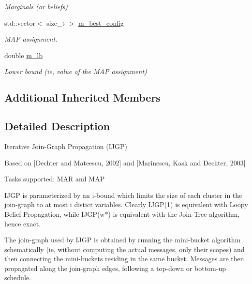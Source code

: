 \begin{DoxyCompactItemize}
\begin{DoxyCompactList}\small\item\em Marginals (or beliefs) \end{DoxyCompactList}\item 
\hypertarget{classmerlin_1_1ijgp_a6f00b802c54c7d225001577edb51bbc8}{}std\+::vector$<$ size\+\_\+t $>$ \hyperlink{classmerlin_1_1ijgp_a6f00b802c54c7d225001577edb51bbc8}{m\+\_\+best\+\_\+config}\label{classmerlin_1_1ijgp_a6f00b802c54c7d225001577edb51bbc8}

\begin{DoxyCompactList}\small\item\em M\+A\+P assignment. \end{DoxyCompactList}\item 
\hypertarget{classmerlin_1_1ijgp_a5665048f86025d11b0c4fe40eeb4ddfb}{}double \hyperlink{classmerlin_1_1ijgp_a5665048f86025d11b0c4fe40eeb4ddfb}{m\+\_\+lb}\label{classmerlin_1_1ijgp_a5665048f86025d11b0c4fe40eeb4ddfb}

\begin{DoxyCompactList}\small\item\em Lower bound (ie, value of the M\+A\+P assignment) \end{DoxyCompactList}\end{DoxyCompactItemize}
\subsection*{Additional Inherited Members}


\subsection{Detailed Description}
Iterative Join-\/\+Graph Propagation (I\+J\+G\+P)

Based on \mbox{[}Dechter and Mateescu, 2002\mbox{]} and \mbox{[}Marinescu, Kask and Dechter, 2003\mbox{]}

Tasks supported\+: M\+A\+R and M\+A\+P

I\+J\+G\+P is parameterized by an i-\/bound which limits the size of each cluster in the join-\/graph to at most i distict variables. Clearly I\+J\+G\+P(1) is equivalent with Loopy Belief Propagation, while I\+J\+G\+P(w$\ast$) is equivalent with the Join-\/\+Tree algorithm, hence exact.

The join-\/graph used by I\+J\+G\+P is obtained by running the mini-\/bucket algorithm schematically (ie, without computing the actual messages, only their scopes) and then connecting the mini-\/buckets residing in the same bucket. Messages are then propagated along the join-\/graph edges, following a top-\/down or bottom-\/up schedule.

